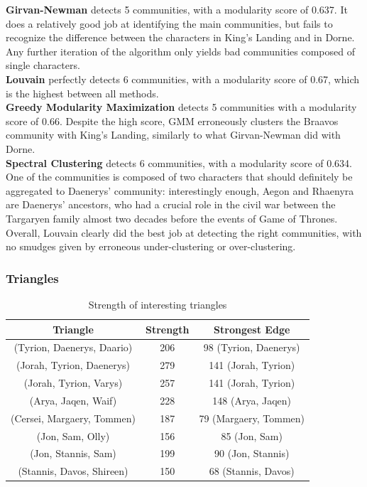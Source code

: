 \documentclass[10pt,twocolumn,letterpaper]{article}
\begin{document}
\textbf{Girvan-Newman} detects 5 communities, with a modularity score of 0.637. It does a relatively good job at identifying the main communities, but fails to recognize the difference between the characters in King's Landing and in Dorne. Any further iteration of the algorithm only yields bad communities composed of single characters.\\

\textbf{Louvain} perfectly detects 6 communities, with a modularity score of 0.67, which is the highest between all methods. \\

\textbf{Greedy Modularity Maximization} detects 5 communities with a modularity score of 0.66. Despite the high score, GMM erroneously clusters the Braavos community with King's Landing, similarly to what Girvan-Newman did with Dorne. \\

\textbf{Spectral Clustering} detects 6 communities, with a modularity score of 0.634. One of the communities is composed of two characters that should definitely be aggregated to Daenerys' community: interestingly enough, Aegon and Rhaenyra are Daenerys' ancestors, who had a crucial role in the civil war between the Targaryen family almost two decades before the events of Game of Thrones. \\

Overall, Louvain clearly did the best job at detecting the right communities, with no smudges given by erroneous under-clustering or over-clustering.

\subsubsection{Triangles}

\begin{table}[h!]
    \centering
    \small
    \begin{tabular}{c|c|c}
        Triangle & Strength & Strongest Edge  \\
        \hline
        (Tyrion, Daenerys, Daario) & 206 & 98 (Tyrion, Daenerys) \\
        (Jorah, Tyrion, Daenerys) & 279 & 141 (Jorah, Tyrion) \\
        (Jorah, Tyrion, Varys) & 257 & 141 (Jorah, Tyrion) \\
        (Arya, Jaqen, Waif) & 228 & 148 (Arya, Jaqen) \\
        (Cersei, Margaery, Tommen) & 187 & 79 (Margaery, Tommen) \\
        (Jon, Sam, Olly) & 156 & 85 (Jon, Sam) \\
        (Jon, Stannis, Sam) & 199 & 90 (Jon, Stannis) \\
        (Stannis, Davos, Shireen) & 150 & 68 (Stannis, Davos) \\
        \hline 
    \end{tabular} \\
    \vspace{0.2cm}
    \caption{Strength of interesting triangles}
    \label{tab:my_label}
\end{table}
\end{document}
